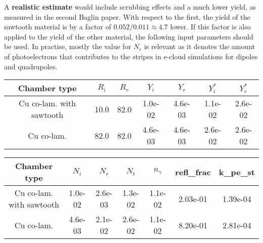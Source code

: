 A \textbf{realistic estimate} would include scrubbing effects and a much lower yield, as measured in the second Baglin paper.
With respect to the first, the yield of the sawtooth material is by a factor of $0.052/0.011 \approx 4.7$ lower.
If this factor is also applied to the yield of the other material, the following input parameters should be used.
In practise, mostly the value for $N_r$ is relevant as it denotes the amount of photoelectrons that contributes to the stripes in e-cloud simulations for dipoles and quadrupoles.

\begin{center}
    \begin{tabular}{c|cccc|cc}
	Chamber type & $R_i$ & $R_r$ & $Y_i$ & $Y_r$ & $Y_i^*$ & $Y_r^*$  \\ \hline 
	Cu co-lam. with sawtooth& 10.0 &82.0 &1.0e-02 &4.6e-03& 1.1e-02 &2.6e-02 \\
	Cu co-lam.& 82.0 &82.0 &4.6e-03 &4.6e-03& 2.6e-02 &2.6e-02 \\
    \end{tabular}
\end{center}

\begin{center}
    \begin{tabular}{c|ccc|c|cc}
	Chamber type & $N_i$ & $N_r$ & $N_t$ & $n_\gamma$ & refl\_frac & k\_pe\_st \\ \hline 
	Cu co-lam. with sawtooth& 1.0e-02 &2.6e-03 &1.3e-02 &1.1e-02 &2.03e-01 &1.39e-04\\
	Cu co-lam.& 4.6e-03 &2.1e-02 &2.6e-02 &1.1e-02 &8.20e-01 &2.81e-04\\
    \end{tabular}
\end{center}




